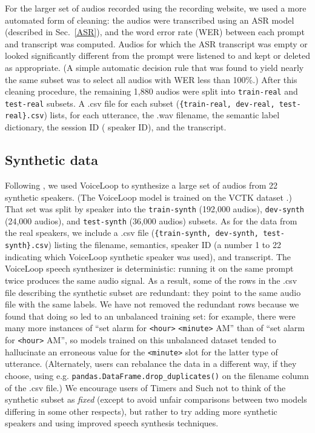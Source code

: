 \documentclass{article}
\begin{document}
For the larger set of audios recorded using the recording website, we used a more automated form of cleaning: the audios were transcribed using an ASR model (described in Sec.~\ref{ASR}), and the word error rate (WER) between each prompt and transcript was computed. Audios for which the ASR transcript was empty or looked significantly different from the prompt were listened to and kept or deleted as appropriate. 
(A simple automatic decision rule that was found to yield nearly the same subset was to select all audios with WER less than 100\%.) 
After this cleaning procedure, the remaining 1,880 audios were split into \texttt{train-real} and \texttt{test-real} subsets. A .csv file for each subset (\texttt{\{train-real, dev-real, test-real\}.csv}) lists, for each utterance, the .wav filename, the semantic label dictionary, the session ID ( speaker ID), and the transcript.

\subsection{Synthetic data}
Following \cite{lugosch2020using}, we used VoiceLoop \cite{taigman2017voice} to synthesize a large set of audios from 22 synthetic speakers. (The VoiceLoop model is trained on the VCTK dataset \cite{veaux2017cstr}.) That set was split by speaker into the \texttt{train-synth} (192,000 audios), \texttt{dev-synth} (24,000 audios), and \texttt{test-synth} (36,000 audios) subsets. As for the data from the real speakers, we include a .csv file (\texttt{\{train-synth, dev-synth, test-synth\}.csv}) listing the filename, semantics, speaker ID (a number 1 to 22 indicating which VoiceLoop synthetic speaker was used), and transcript.
The VoiceLoop speech synthesizer is deterministic: running it on the same prompt twice produces the same audio signal. As a result, some of the rows in the .csv file describing the synthetic subset are redundant: they point to the same audio file with the same labels. We have not removed the redundant rows because we found that doing so led to an unbalanced training set: for example, there were many more instances of ``set alarm for \texttt{<hour>} \texttt{<minute>} AM'' than of ``set alarm for \texttt{<hour>} AM'', so models trained on this unbalanced dataset tended to hallucinate an erroneous value for the \texttt{<minute>} slot for the latter type of utterance. (Alternately, users can rebalance the data in a different way, if they choose, using e.g. \texttt{pandas.DataFrame.drop\_duplicates()} on the filename column of the .csv file.) 
We encourage users of Timers and Such not to think of the synthetic subset as \textit{fixed} (except to avoid unfair comparisons between two models differing in some other respects), but rather to try adding more synthetic speakers and using improved speech synthesis techniques. 
\end{document}
